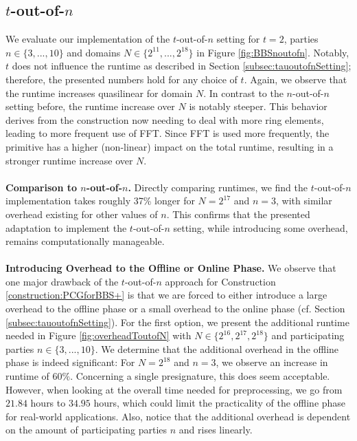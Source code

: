 \subsection{$t$-out-of-$n$}
\label{subsec:toutofnEval}
We evaluate our implementation of the $t$-out-of-$n$ setting for $t = 2$, parties $n\in \{3, ..., 10\}$ and domains $N\in \{2^{11}, ...,2^{18}\}$ in Figure \ref{fig:BBSnoutofn}. Notably, $t$ does not influence the runtime as described in Section \ref{subsec:tauoutofnSetting}; therefore, the presented numbers hold for any choice of $t$. Again, we observe that the runtime increases quasilinear for domain $N$. In contrast to the $n$-out-of-$n$ setting before, the runtime increase over $N$ is notably steeper. This behavior derives from the construction now needing to deal with more ring elements, leading to more frequent use of FFT. Since FFT is used more frequently, the primitive has a higher (non-linear) impact on the total runtime, resulting in a stronger runtime increase over $N$.
\\\\
\textbf{Comparison to $n$-out-of-$n$.} Directly comparing runtimes, we find the $t$-out-of-$n$ implementation takes roughly 37\% longer for $N=2^{17}$ and $n=3$, with similar overhead existing for other values of $n$. This confirms that the presented adaptation to implement the $t$-out-of-$n$ setting, while introducing some overhead, remains computationally manageable.
\\\\
\textbf{Introducing Overhead to the Offline or Online Phase.} We observe that one major drawback of the $t$-out-of-$n$ approach for Construction \ref{construction:PCGforBBS+} is that we are forced to either introduce a large overhead to the offline phase or a small overhead to the online phase (cf. Section \ref{subsec:tauoutofnSetting}). For the first option, we present the additional runtime needed in Figure \ref{fig:overheadToutofN} with $N\in \{2^{16}, 2^{17}, 2^{18}\}$ and participating parties $n\in\{3,...,10\}$. We determine that the additional overhead in the offline phase is indeed significant: For $N=2^{18}$ and $n=3$, we observe an increase in runtime of $60\%$. Concerning a single presignature, this does seem acceptable. However, when looking at the overall time needed for preprocessing, we go from $ 21.84 $ hours to $ 34.95 $ hours, which could limit the practicality of the offline phase for real-world applications. Also, notice that the additional overhead is dependent on the amount of participating parties $n$ and rises linearly.
